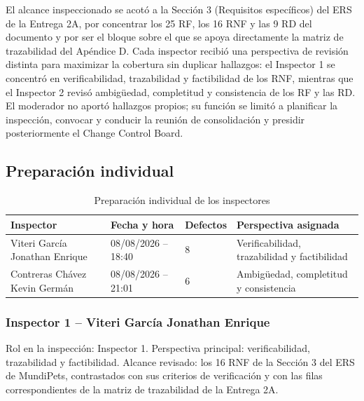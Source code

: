 \documentclass[journal,onecolumn]{IEEEtran}
\begin{document}
	El alcance inspeccionado se acotó a la Sección 3 (Requisitos específicos) del ERS de la Entrega
	2A, por concentrar los 25 RF, los 16 RNF y las 9 RD del documento y por ser el bloque sobre el que
	se apoya directamente la matriz de trazabilidad del Apéndice D. Cada inspector recibió una
	perspectiva de revisión distinta para maximizar la cobertura sin duplicar hallazgos: el Inspector 1
	se concentró en verificabilidad, trazabilidad y factibilidad de los RNF, mientras que el Inspector
	2 revisó ambigüedad, completitud y consistencia de los RF y las RD. El moderador no aportó
	hallazgos propios; su función se limitó a planificar la inspección, convocar y conducir la reunión
	de consolidación y presidir posteriormente el Change Control Board.
	
	\subsection{Preparación individual}
	\label{sec:preparacion}
	
	\begin{table}[H]
		\centering
		\caption{Preparación individual de los inspectores}
		\label{tab:preparacion}
		\begin{tabular}{L{4.5cm} L{3.5cm} C{2.5cm} L{3.0cm}}
			\toprule
			\textbf{Inspector} & \textbf{Fecha y hora} & \textbf{Defectos} &
			\textbf{Perspectiva asignada} \\
			\midrule
			Viteri García Jonathan Enrique & 08/08/2026 -- 18:40 & 8 &
			Verificabilidad, trazabilidad y factibilidad \\
			\addlinespace
			Contreras Chávez Kevin Germán & 08/08/2026 -- 21:01 & 6 &
			Ambigüedad, completitud y consistencia \\
			\bottomrule
		\end{tabular}
	\end{table}
	
	\subsubsection{Inspector 1 -- Viteri García Jonathan Enrique}
	
	Rol en la inspección: Inspector 1. Perspectiva principal: verificabilidad, trazabilidad y
	factibilidad. Alcance revisado: los 16 RNF de la Sección 3 del ERS de MundiPets, contrastados con
	sus criterios de verificación y con las filas correspondientes de la matriz de trazabilidad de la
	Entrega 2A.
	
\end{document}
